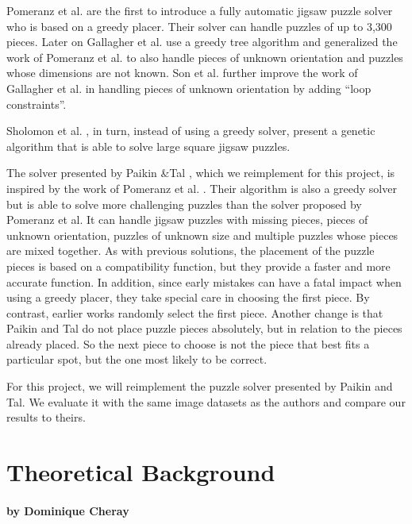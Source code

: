 \documentclass[11pt]{report}
\begin{document}
Pomeranz et al. \cite{Pomeranz2011} are the first to introduce a fully
automatic jigsaw puzzle solver who is based on a greedy placer. Their solver
can handle puzzles of up to 3,300 pieces. Later on Gallagher et al.
\cite{gallagher2012jigsaw} use a greedy tree algorithm and generalized the work
of Pomeranz et al. to also handle pieces of unknown orientation and puzzles
whose dimensions are not known. Son et al. \cite{son2014solving} further
improve the work of Gallagher et al. in handling pieces of unknown orientation
by adding ``loop constraints''.

Sholomon et al. \cite{sholomon2013genetic}, in turn, instead of using a greedy
solver, present a genetic algorithm that is able to solve large square jigsaw
puzzles.

The solver presented by Paikin \&Tal \cite{Paikin2015}, which we reimplement for
this project, is inspired by the work of Pomeranz et al. \cite{Pomeranz2011}.
Their algorithm is also a greedy solver but is able to solve more challenging
puzzles than the solver proposed by Pomeranz et al. It can handle jigsaw puzzles with
missing pieces, pieces of unknown orientation, puzzles of unknown size and
multiple puzzles whose pieces are mixed together. As with previous solutions,
the placement of the puzzle pieces is based on a compatibility function, but
they provide a faster and more accurate function. In addition, since early
mistakes can have a fatal impact when using a greedy placer, they take special
care in choosing the first piece. By contrast, earlier works randomly select the
first piece. Another change is that Paikin and Tal do not place puzzle pieces
absolutely, but in relation to the pieces already placed. So the next piece to
choose is not the piece that best fits a particular spot, but the one most
likely to be correct.

For this project, we will reimplement the puzzle solver presented by
Paikin and Tal. We evaluate it with the same image datasets as the authors and
compare our results to theirs.


\chapter{Theoretical Background}
\subsubsection*{by Dominique Cheray}
\end{document}
